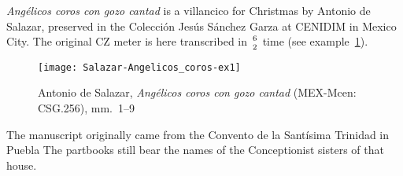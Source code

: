 \documentclass[12pt]{article}
\begin{document}
\emph{Angélicos coros con gozo cantad} is a villancico for Christmas by Antonio de Salazar, preserved in the Colección Jesús Sánchez Garza at CENIDIM in Mexico City.
The original CZ meter is here transcribed in ${6 \atop 2}$ time (see example~\ref{ex:Salazar1}).

\begin{figure}
\texttt{[image: Salazar-Angelicos\_coros-ex1]}
\caption{Antonio de Salazar, \emph{Angélicos coros con gozo cantad} (MEX-Mcen: CSG.256), mm.~1--9}
\label{ex:Salazar1}
\end{figure}

The manuscript originally came from the Convento de la Santísima Trinidad in Puebla
The partbooks still bear the names of the Conceptionist sisters of that house.
\end{document}
